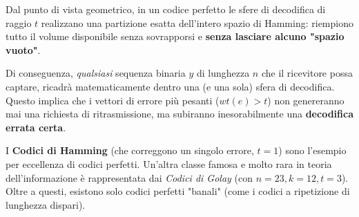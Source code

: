 Dal punto di vista geometrico, in un codice perfetto le sfere di decodifica di raggio $t$ realizzano una partizione esatta dell'intero spazio di Hamming: riempiono tutto il volume disponibile senza sovrapporsi e \textbf{senza lasciare alcuno "spazio vuoto"}. 

Di conseguenza, \textit{qualsiasi} sequenza binaria $y$ di lunghezza $n$ che il ricevitore possa captare, ricadrà matematicamente dentro una (e una sola) sfera di decodifica. Questo implica che i vettori di errore più pesanti ($wt(e) > t$) non genereranno mai una richiesta di ritrasmissione, ma subiranno inesorabilmente una \textbf{decodifica errata certa}.

\begin{esempio}
I \textbf{Codici di Hamming} (che correggono un singolo errore, $t=1$) sono l'esempio per eccellenza di codici perfetti. Un'altra classe famosa e molto rara in teoria dell'informazione è rappresentata dai \textit{Codici di Golay} (con $n=23,k=12,t=3$). Oltre a questi, esistono solo codici perfetti "banali" (come i codici a ripetizione di lunghezza dispari).
\end{esempio}